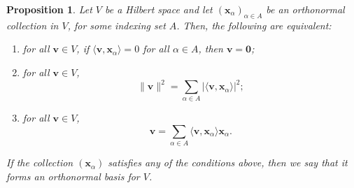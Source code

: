 \documentclass[a4paper, openany]{memoir}
\theoremstyle{definition}
\theoremstyle{plain}
\newtheorem{proposition}[definition]{Proposition}
\begin{document}
    \begin{proposition}
        Let $V$ be a Hilbert space and let $(\bm{x}_\alpha)_{\alpha \in A}$ be an orthonormal collection in $V$, for some indexing set $A$. Then, the following are equivalent:
        \begin{enumerate}
            \item for all $\bm{v} \in V$, if $\langle \bm{v}, \bm{x}_\alpha \rangle = 0$ for all $\alpha \in A$, then $\bm{v} = \bm{0}$;
            \item for all $\bm{v} \in V$,
            \[\lVert \bm{v} \rVert^2 = \sum_{\alpha \in A} |\langle \bm{v}, \bm{x}_\alpha \rangle|^2;\]
            \item for all $\bm{v} \in V$,
            \[\bm{v} = \sum_{\alpha \in A} \langle \bm{v}, \bm{x}_\alpha \rangle \bm{x}_\alpha.\]
        \end{enumerate}
        If the collection $(\bm{x}_\alpha)$ satisfies any of the conditions above, then we say that it forms an \emph{orthonormal basis for $V$}.
    \end{proposition}
\end{document}

